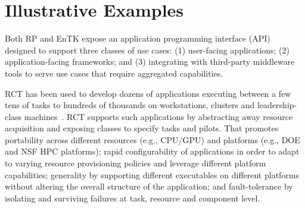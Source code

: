 \documentclass[preprint,12pt, a4paper]{elsarticle}
\begin{document}
\section{Illustrative Examples}\label{sec:examples}




Both RP and EnTK expose an application programming interface
(API)~\cite{rp-api-url,entk-api-url} designed to support three classes of use
cases: (1) user-facing applications; (2) application-facing frameworks; and (3)
integrating with third-party middleware tools to serve use cases that require
aggregated capabilities.


RCT has been used to develop dozens of applications executing between a few tens
of tasks to hundreds of thousands on workstations, clusters and leadership-class
machines~\cite{radical-pub-url}. RCT supports such applications by abstracting
away resource acquisition and exposing classes to specify tasks and pilots. That
promotes portability across different resources (e.g., CPU/GPU) and platforms
(e.g., DOE and NSF HPC platforms); rapid configurability of applications in
order to adapt to varying resource provisioning policies and leverage different
platform capabilities; generality by supporting different executables on
different platforms without altering the overall structure of the application;
and fault-tolerance by isolating and surviving failures at task, resource and
component level.
\end{document}
